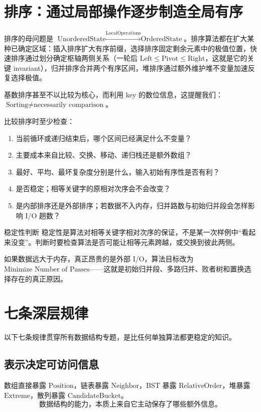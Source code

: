 \documentclass[11pt,a4paper,openany]{ctexbook}
\begin{document}
\section{排序：通过局部操作逐步制造全局有序}
排序的母问题是 $\text{UnorderedState}\xrightarrow{\text{LocalOperations}}\text{OrderedState}$。排序算法都在扩大某种已确定区域：插入排序扩大有序前缀，选择排序固定剩余元素中的极值位置，快速排序通过划分确定枢轴两侧关系（一轮后 $\text{Left}\le\text{Pivot}\le\text{Right}$，这就是它的关键 invariant），归并排序合并两个有序区间，堆排序通过额外维护堆不变量加速反复选择极值。

基数排序甚至不以比较为核心，而利用 key 的数位信息，这提醒我们：$\text{Sorting}\neq\text{necessarily comparison}$。

比较排序时至少检查：
\begin{enumerate}
  \item 当前循环或递归结束后，哪个区间已经满足什么不变量？
  \item 主要成本来自比较、交换、移动、递归栈还是额外数组？
  \item 最好、平均、最坏复杂度分别是什么，输入初始有序性是否有利？
  \item 是否稳定；相等关键字的原相对次序会不会改变？
  \item 是内部排序还是外部排序；若数据不入内存，归并路数与初始归并段会怎样影响 I/O 趟数？
\end{enumerate}

\begin{warnbox}{稳定性判断}
稳定性是算法对相等关键字相对次序的保证，不是某一次样例中“看起来没变”。判断时要检查算法是否可能让相等元素跨越，或交换到彼此两侧。
\end{warnbox}

如果数据远大于内存，真正昂贵的是外部 I/O，算法目标改为 $\boxed{\text{Minimize Number of Passes}}$——这就是初始归并段、多路归并、败者树和置换选择存在的真正原因。

\section{七条深层规律}

以下七条规律贯穿所有数据结构专题，是比任何单独算法都更稳定的知识。

\subsection{表示决定可访问信息}
数组直接暴露 $\text{Position}$，链表暴露 $\text{Neighbor}$，BST 暴露 $\text{RelativeOrder}$，堆暴露 $\text{Extreme}$，散列暴露 $\text{CandidateBucket}$。
\[
\boxed{\text{数据结构的能力，本质上来自它主动保存了哪些额外信息。}}
\]
\end{document}
